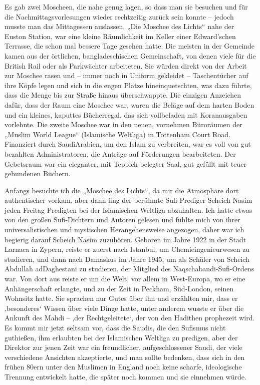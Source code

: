 \documentclass[12pt]{memoir}
\begin{document}
Es gab zwei Moscheen, die nahe genug lagen, so dass man sie besuchen
und für die Nachmittagsvorlesungen wieder rechtzeitig zurück sein konnte
– jedoch musste man das Mittagessen auslassen.
„Die Moschee des Lichts“ nahe der Euston Station,
war eine kleine Räumlichkeit im Keller einer Edward’schen Terrasse,
die schon mal bessere Tage gesehen hatte.
Die meisten in der Gemeinde kamen aus der örtlichen,
bangladeschischen Gemeinschaft,
von denen viele für die British Rail oder als Parkwächter arbeiteten.
Sie würden direkt von der Arbeit zur Moschee rasen und –
immer noch in Uniform gekleidet – Taschentücher auf ihre Köpfe legen
und sich in die engen Plätze hineinquetschten, was dazu führte,
dass die Menge bis zur Straße hinaus überschwappte.
Die einzigen Anzeichen dafür, dass der Raum eine Moschee war,
waren die Beläge auf dem harten Boden und ein kleines, kaputtes Bücherregal,
das sich vollbeladen mit Koranausgaben vorlehnte.
Die zweite Moschee war in den neuen,
vornehmen Büroräumen der „Muslim World League“ (Islamische Weltliga)
in Tottenham Court Road.
Finanziert durch Saudi\–Arabien, um den Islam zu verbreiten,
war es voll von gut bezahlten Administratoren,
die Anträge auf Förderungen bearbeiteten.
Der Gebetsraum war ein eleganter, mit Teppich belegter Saal,
gut gefüllt mit teuer gebundenen Büchern.

Anfangs besuchte ich die „Moschee des Lichts“,
da mir die Atmosphäre dort authentischer vorkam,
aber dann fing der berühmte Sufi-Prediger Scheich Nasim
jeden Freitag Predigten bei der Islamischen Weltliga abzuhalten.
Ich hatte etwas von den großen Sufi-Dichtern und Autoren gelesen
und fühlte mich von ihrer universalistischen
und mystischen Herangehensweise angezogen,
daher war ich begierig darauf Scheich Nasim zuzuhören.
Geboren im Jahre 1922 in der Stadt Larnaca in Zypern,
reiste er zuerst nach Istanbul, um Chemieingenieurwesen zu studieren,
und dann nach Damaskus im Jahre 1945,
um als Schüler von Scheich Abdullah ad\–Daghestani zu studieren,
der Mitglied des Naqschabandi-Sufi-Ordens war.
Von dort aus reiste er um die Welt, vor allem in West-Europa,
wo er eine Anhängerschaft erlangte, und zu der Zeit in Peckham,
Süd-London, seinen Wohnsitz hatte.
Sie sprachen nur Gutes über ihn und erzählten mir,
dass er ‚besonderes‘ Wissen über viele Dinge hatte,
unter anderem wusste er über die Ankunft des Mahdi –
‚der Rechtgeleitete‘, der von den Hadithen prophezeit wird.
Es kommt mir jetzt seltsam vor, dass die Saudis,
die den Sufismus nicht guthießen,
ihm erlaubten bei der Islamischen Weltliga zu predigen,
aber der Direktor zur jenen Zeit war ein freundlicher,
aufgeschlossener Saudi, der viele verschiedene Ansichten akzeptierte,
und man sollte bedenken, dass sich in den frühen 80ern
unter den Muslimen in England noch keine scharfe,
ideologische Trennung entwickelt hatte,
die später noch kommen und sie einnehmen würde.
\end{document}
